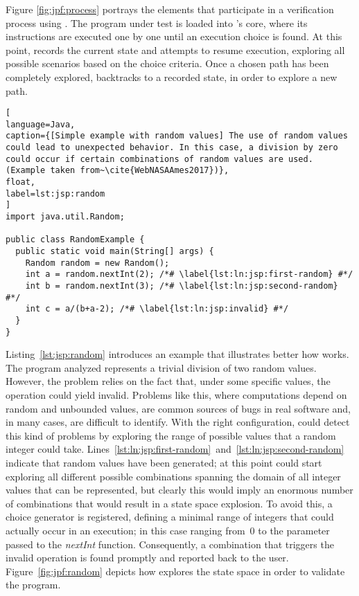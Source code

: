 Figure \ref{fig:jpf:process} portrays the elements that participate in a verification process using \jpf. The program under test is loaded into \jpf's core, where its instructions are executed one by one until an execution choice is found. At this point, \jpf records the current state and attempts to resume execution, exploring all possible scenarios based on the choice criteria. Once a chosen path has been completely explored, \jpf backtracks to a recorded state, in order to explore a new path.

\begin{lstlisting}[
language=Java,
caption={[Simple example with random values] The use of random values could lead to unexpected behavior. In this case, a division by zero could occur if certain combinations of random values are used. (Example taken from~\cite{WebNASAAmes2017})},
float,
label=lst:jsp:random
]
import java.util.Random;

public class RandomExample {
  public static void main(String[] args) {
    Random random = new Random();
    int a = random.nextInt(2); /*# \label{lst:ln:jsp:first-random} #*/
    int b = random.nextInt(3); /*# \label{lst:ln:jsp:second-random} #*/
    int c = a/(b+a-2); /*# \label{lst:ln:jsp:invalid} #*/
  }
}
\end{lstlisting}

Listing~\ref{lst:jsp:random} introduces an example that illustrates better how  works. The program analyzed represents a trivial division of two random values. However, the problem relies on the fact that, under some specific values, the operation could yield invalid. Problems like this, where computations depend on random and unbounded values, are common sources of bugs in real software and, in many cases, are difficult to identify. With the right configuration,  could detect this kind of problems by exploring the range of possible values that a random integer could take. Lines~\ref{lst:ln:jsp:first-random}~and~\ref{lst:ln:jsp:second-random} indicate that random values have been generated; at this point  could start exploring all different possible combinations spanning the domain of all integer values that can be represented, but clearly this would imply an enormous number of combinations that would result in a state space explosion. To avoid this, a choice generator is registered, defining a minimal range of integers that could actually occur in an execution; in this case ranging from~0 to the parameter passed to the \textit{nextInt} function. Consequently, a combination that triggers the invalid operation is found promptly and reported back to the user. Figure~\ref{fig:jpf:random} depicts how \jpf explores the state space in order to validate the program.

